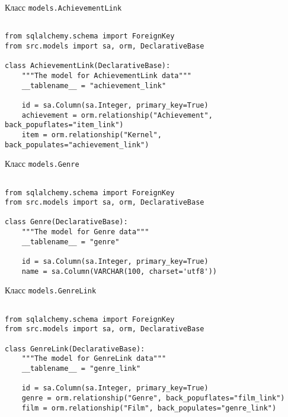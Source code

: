 \begin{center}Класс \texttt{models.AchievementLink}\end{center}

\begin{lstlisting}[style=app]

from sqlalchemy.schema import ForeignKey
from src.models import sa, orm, DeclarativeBase

class AchievementLink(DeclarativeBase):
    """The model for AchievementLink data"""
    __tablename__ = "achievement_link"

    id = sa.Column(sa.Integer, primary_key=True)
    achievement = orm.relationship("Achievement", back_popuflates="item_link")
    item = orm.relationship("Kernel", back_populates="achievement_link")

  \end{lstlisting}


\begin{center}Класс \texttt{models.Genre}\end{center}

\begin{lstlisting}[style=app]

from sqlalchemy.schema import ForeignKey
from src.models import sa, orm, DeclarativeBase

class Genre(DeclarativeBase):
    """The model for Genre data"""
    __tablename__ = "genre"

    id = sa.Column(sa.Integer, primary_key=True)
    name = sa.Column(VARCHAR(100, charset='utf8'))

\end{lstlisting}

\begin{center}Класс \texttt{models.GenreLink}\end{center}

\begin{lstlisting}[style=app]

from sqlalchemy.schema import ForeignKey
from src.models import sa, orm, DeclarativeBase

class GenreLink(DeclarativeBase):
    """The model for GenreLink data"""
    __tablename__ = "genre_link"

    id = sa.Column(sa.Integer, primary_key=True)
    genre = orm.relationship("Genre", back_popuflates="film_link")
    film = orm.relationship("Film", back_populates="genre_link")

  \end{lstlisting}
